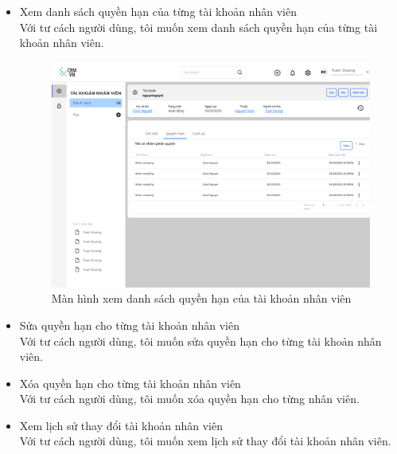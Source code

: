 \documentclass[12pt,a4paper]{article}
\begin{document}
\begin{enumerate}
\begin{itemize}
            \item Xem danh sách quyền hạn của từng tài khoản nhân viên \\
            Với tư cách người dùng, tôi muốn xem danh sách quyền hạn của từng tài khoản nhân viên.

            \begin{figure}[H]
                \centering \includegraphics[width=\textwidth]{Img/Nguyet/TKNV/quyenhan.png}
                \vspace{0.5cm}
                \caption{Màn hình xem danh sách quyền hạn của tài khoản nhân viên}
                \label{qhtknvs}
            \end{figure}

            \item Sửa quyền hạn cho từng tài khoản nhân viên \\
            Với tư cách người dùng, tôi muốn sửa quyền hạn cho từng tài khoản nhân viên.

            \item Xóa quyền hạn cho từng tài khoản nhân viên \\
            Với tư cách người dùng, tôi muốn xóa quyền hạn cho từng nhân viên.

            \item Xem lịch sử thay đổi tài khoản nhân viên \\
            Với tư cách người dùng, tôi muốn xem lịch sử thay đổi tài khoản nhân viên.


\end{itemize}
\end{enumerate}
\end{document}
